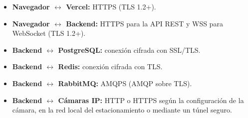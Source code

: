 \begin{itemize}
    \item \textbf{Navegador $\leftrightarrow$ Vercel:} HTTPS (TLS 1.2+).
    \item \textbf{Navegador $\leftrightarrow$ Backend:} HTTPS para la API REST y WSS para WebSocket (TLS 1.2+).
    \item \textbf{Backend $\leftrightarrow$ PostgreSQL:} conexión cifrada con SSL/TLS.
    \item \textbf{Backend $\leftrightarrow$ Redis:} conexión cifrada con TLS.
    \item \textbf{Backend $\leftrightarrow$ RabbitMQ:} AMQPS (AMQP sobre TLS).
    \item \textbf{Backend $\leftrightarrow$ Cámaras IP:} HTTP o HTTPS según la configuración de la cámara, en la red local del estacionamiento o mediante un túnel seguro.
\end{itemize}
